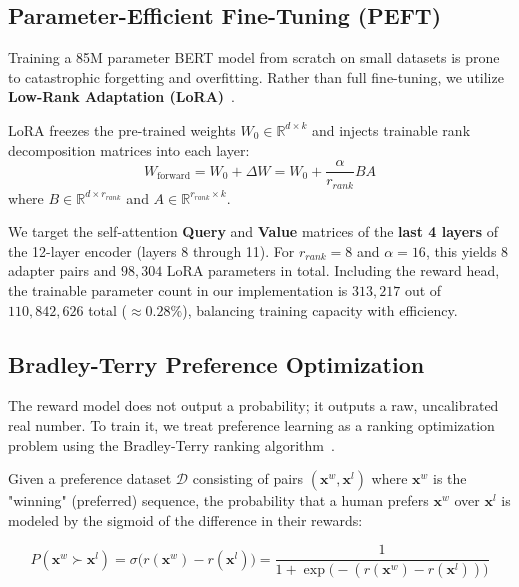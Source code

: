 \documentclass[11pt,a4paper]{article}
\begin{document}
\subsection{Parameter-Efficient Fine-Tuning (PEFT)}

Training a 85M parameter BERT model from scratch on small datasets is prone to catastrophic forgetting and overfitting. Rather than full fine-tuning, we utilize \textbf{Low-Rank Adaptation (LoRA)}~\cite{hu2022lora}.

LoRA freezes the pre-trained weights $W_0 \in \mathbb{R}^{d \times k}$ and injects trainable rank decomposition matrices into each layer:
\begin{equation}
    W_{\text{forward}} = W_0 + \Delta W = W_0 + \frac{\alpha}{r_{rank}} B A
\end{equation}
where $B \in \mathbb{R}^{d \times r_{rank}}$ and $A \in \mathbb{R}^{r_{rank} \times k}$. 

We target the self-attention \textbf{Query} and \textbf{Value} matrices of the \textbf{last 4 layers} of the 12-layer encoder (layers 8 through 11). For $r_{rank}=8$ and $\alpha=16$, this yields 8 adapter pairs and $98{,}304$ LoRA parameters in total. Including the reward head, the trainable parameter count in our implementation is $313{,}217$ out of $110{,}842{,}626$ total ($\approx 0.28\%$), balancing training capacity with efficiency.

\subsection{Bradley-Terry Preference Optimization}

The reward model does not output a probability; it outputs a raw, uncalibrated real number. To train it, we treat preference learning as a ranking optimization problem using the Bradley-Terry ranking algorithm~\cite{bradley1952rank}.

Given a preference dataset $\mathcal{D}$ consisting of pairs $(\mathbf{x}^w, \mathbf{x}^l)$ where $\mathbf{x}^w$ is the "winning" (preferred) sequence, the probability that a human prefers $\mathbf{x}^w$ over $\mathbf{x}^l$ is modeled by the sigmoid of the difference in their rewards:

\begin{equation}
    P(\mathbf{x}^w \succ \mathbf{x}^l) = \sigma\bigl(r(\mathbf{x}^w) - r(\mathbf{x}^l)\bigr) = \frac{1}{1 + \exp\bigl(-(r(\mathbf{x}^w) - r(\mathbf{x}^l))\bigr)}
\end{equation}
\end{document}
